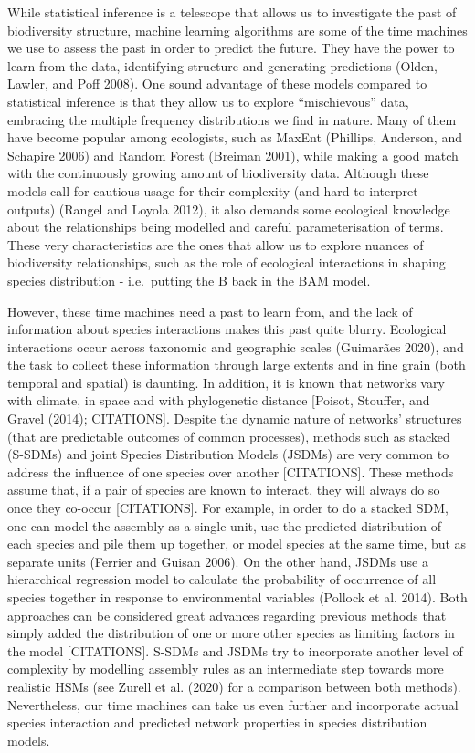\documentclass[11pt]{article}
\begin{document}
While statistical inference is a telescope that allows us to investigate
the past of biodiversity structure, machine learning algorithms are some
of the time machines we use to assess the past in order to predict the
future. They have the power to learn from the data, identifying
structure and generating predictions (Olden, Lawler, and Poff 2008). One
sound advantage of these models compared to statistical inference is
that they allow us to explore ``mischievous'' data, embracing the
multiple frequency distributions we find in nature. Many of them have
become popular among ecologists, such as MaxEnt (Phillips, Anderson, and
Schapire 2006) and Random Forest (Breiman 2001), while making a good
match with the continuously growing amount of biodiversity data.
Although these models call for cautious usage for their complexity (and
hard to interpret outputs) (Rangel and Loyola 2012), it also demands
some ecological knowledge about the relationships being modelled and
careful parameterisation of terms. These very characteristics are the
ones that allow us to explore nuances of biodiversity relationships,
such as the role of ecological interactions in shaping species
distribution - i.e.~putting the B back in the BAM model.

However, these time machines need a past to learn from, and the lack of
information about species interactions makes this past quite blurry.
Ecological interactions occur across taxonomic and geographic scales
(Guimarães 2020), and the task to collect these information through
large extents and in fine grain (both temporal and spatial) is daunting.
In addition, it is known that networks vary with climate, in space and
with phylogenetic distance {[}Poisot, Stouffer, and Gravel (2014);
CITATIONS{]}. Despite the dynamic nature of networks' structures (that
are predictable outcomes of common processes), methods such as stacked
(S-SDMs) and joint Species Distribution Models (JSDMs) are very common
to address the influence of one species over another {[}CITATIONS{]}.
These methods assume that, if a pair of species are known to interact,
they will always do so once they co-occur {[}CITATIONS{]}. For example,
in order to do a stacked SDM, one can model the assembly as a single
unit, use the predicted distribution of each species and pile them up
together, or model species at the same time, but as separate units
(Ferrier and Guisan 2006). On the other hand, JSDMs use a hierarchical
regression model to calculate the probability of occurrence of all
species together in response to environmental variables (Pollock et al.
2014). Both approaches can be considered great advances regarding
previous methods that simply added the distribution of one or more other
species as limiting factors in the model {[}CITATIONS{]}. S-SDMs and
JSDMs try to incorporate another level of complexity by modelling
assembly rules as an intermediate step towards more realistic HSMs (see
Zurell et al. (2020) for a comparison between both methods).
Nevertheless, our time machines can take us even further and incorporate
actual species interaction and predicted network properties in species
distribution models.
\end{document}
